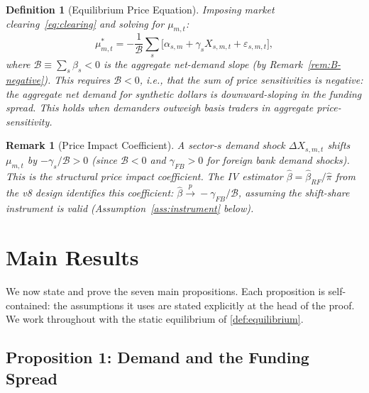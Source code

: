 \documentclass[12pt]{article}
\newtheorem{definition}{Definition}
\newtheorem{remark}{Remark}
\theoremstyle{definition}
\newcommand{\1}[1]{\mathds{1}\left[#1\right]}
\begin{document}
\begin{definition}[Equilibrium Price Equation]
  \label{def:price-eq}
  Imposing market clearing~\eqref{eq:clearing} and solving for $\mu_{m,t}$:
  \begin{equation}
    \mu_{m,t}^* = -\frac{1}{\mathcal{B}} \sum_s \bigl[\alpha_{s,m} +
    \gamma_s X_{s,m,t} + \varepsilon_{s,m,t}\bigr],
    \label{eq:price-eq}
  \end{equation}
  where $\mathcal{B} \equiv \sum_s \beta_s < 0$ is the aggregate net-demand
  slope (by Remark~\ref{rem:B-negative}). This requires $\mathcal{B} < 0$,
  i.e., that the sum of price sensitivities is negative: the aggregate net
  demand for synthetic dollars is downward-sloping in the funding spread. This
  holds when demanders outweigh basis traders in aggregate price-sensitivity.
\end{definition}

\begin{remark}[Price Impact Coefficient]
  \label{rem:price-impact}
  A sector-$s$ demand shock $\Delta X_{s,m,t}$ shifts $\mu_{m,t}$ by
  $-\gamma_s/\mathcal{B} > 0$ (since $\mathcal{B} < 0$ and $\gamma_{FB} > 0$
  for foreign bank demand shocks). This is the structural price impact
  coefficient. The IV estimator $\hat\beta = \hat\beta_{RF}/\hat\pi$ from the
  v8 design identifies this coefficient:
  $\hat\beta \xrightarrow{p} -\gamma_{FB}/\mathcal{B}$, assuming the
  shift-share instrument is valid (Assumption~\ref{ass:instrument} below).
\end{remark}

\section{Main Results}
\label{sec:results}

We now state and prove the seven main propositions. Each proposition is
self-contained: the assumptions it uses are stated explicitly at the head of the
proof. We work throughout with the static equilibrium of
\cref{def:equilibrium}.

\subsection{Proposition 1: Demand and the Funding Spread}
\end{document}
